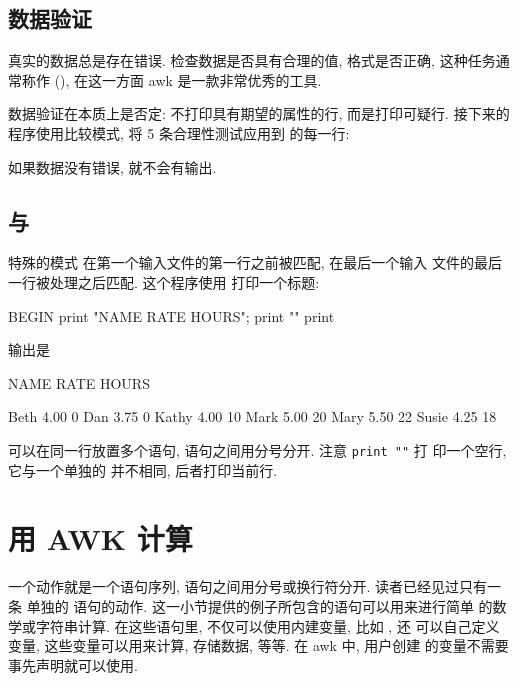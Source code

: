 \subsection{数据验证}
\label{subsec:data_validation}

真实的数据总是存在错误. 检查数据是否具有合理的值, 格式是否正确,
这种任务通常称作 (), 在这一方面 awk
是一款非常优秀的工具.

数据验证在本质上是否定: 不打印具有期望的属性的行, 而是打印可疑行.  接下来的
程序使用比较模式, 将 5 条合理性测试应用到  的每一行:
如果数据没有错误, 就不会有输出.

\subsection{\BEGIN 与 \END}
\label{subsec:an_awk_tutorial_begin_and_end}

特殊的模式 \BEGIN 在第一个输入文件的第一行之前被匹配, \END 在最后一个输入
文件的最后一行被处理之后匹配. 这个程序使用 \BEGIN 打印一个标题:
\begin{awkcode}
    BEGIN { print "NAME     RATE    HOURS"; print "" }
          { print }
\end{awkcode}
输出是
\begin{awkcode}
    NAME     RATE    HOURS

    Beth    4.00    0
    Dan     3.75    0
    Kathy   4.00    10
    Mark    5.00    20
    Mary    5.50    22
    Susie   4.25    18
\end{awkcode}
可以在同一行放置多个语句, 语句之间用分号分开. 注意 \verb'print ""' 打
印一个空行, 它与一个单独的 \print 并不相同, 后者打印当前行.

\section{用 AWK 计算}
\label{sec:computing_with_awk}

一个动作就是一个语句序列, 语句之间用分号或换行符分开. 读者已经见过只有一条
单独的 \print 语句的动作. 这一小节提供的例子所包含的语句可以用来进行简单
的数学或字符串计算. 在这些语句里, 不仅可以使用内建变量, 比如 \nf, 还
可以自己定义变量, 这些变量可以用来计算, 存储数据, 等等. 在 awk 中, 用户创建
的变量不需要事先声明就可以使用.


